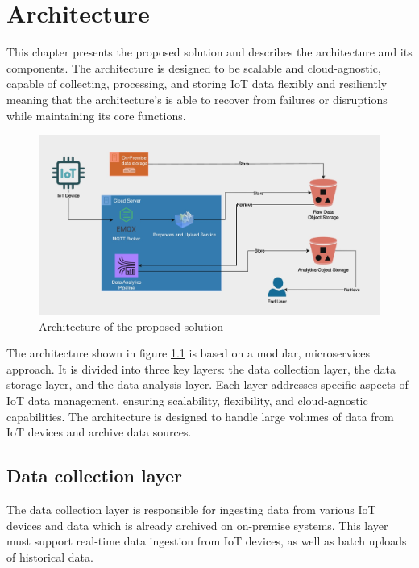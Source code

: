 \chapter{Architecture}
\label{cap:method}

This chapter presents the proposed solution and describes the architecture and its components. The architecture is designed to be scalable and cloud-agnostic, capable of collecting, processing, and storing IoT data flexibly and resiliently meaning that the architecture’s is able to recover from failures or disruptions while maintaining its core functions.



\begin{figure}[htbp]
    \centering
    \includegraphics[width=1\textwidth]{Immagini/architecture.png}
    \caption{Architecture of the proposed solution}
    \label{fig:architecture}
\end{figure}

The architecture shown in figure \ref{fig:architecture} is based on a modular, microservices approach. It is divided into three key layers: the data collection layer, the data storage layer, and the data analysis layer. Each layer addresses specific aspects of IoT data management, ensuring scalability, flexibility, and cloud-agnostic capabilities. The architecture is designed to handle large volumes of data from IoT devices and archive data sources.

\section{Data collection layer}

The data collection layer is responsible for ingesting data from various IoT devices and data which is already archived on on-premise systems. This layer must support real-time data ingestion from IoT devices, as well as batch uploads of historical data.

